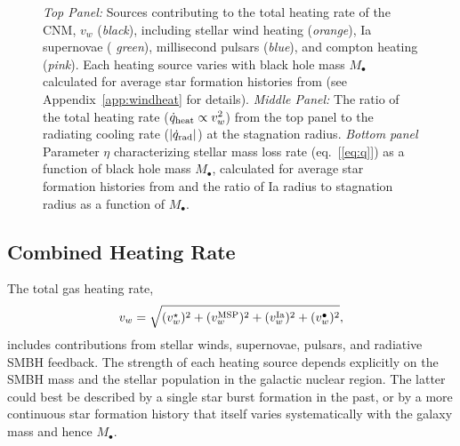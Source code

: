 \documentclass[usenatbib,fleqn]{mn2e}
\newcommand{\Mbh}[1][]{M_{\bullet#1}}
\newcommand{\vwO}{v_{w}}
\begin{document}
\begin{figure}
\caption{\label{fig:vwSources} {\it Top Panel:} Sources contributing
  to the total heating rate of the CNM, $\vwO$ ({\it black}),
  including stellar wind heating ({\it orange}), Ia supernovae ({\it
    green}), millisecond pulsars ({\it blue}), and compton heating
  ({\it pink}).  Each heating source varies with black hole mass
  $\Mbh$ calculated for average star formation histories from
  \citet{MosterNaab+:2013a} (see Appendix~\ref{app:windheat} for
  details).  {\it Middle Panel:} The ratio of the total heating rate
  ($\dot{q}_{\rm heat} \propto v_{w}^{2}$) from the top panel to the
  radiating cooling rate ($|\dot{q}_{\rm rad}|$) at the stagnation
  radius. {\it Bottom panel} Parameter $\eta$ characterizing stellar
  mass loss rate (eq.~[\ref{eq:q}]) as a function of black hole mass
  $\Mbh$, calculated for average star formation histories from and the
  ratio of Ia radius to stagnation radius as a function of $\Mbh$.}
\end{figure}





\subsection{Combined Heating Rate} 
\label{sec:combined}


The total gas heating rate, 
\begin{equation}
\vwO = \sqrt{(v_{w}^{\star})^{2} + (v_{w}^{\rm MSP})^{2} + (v_{w}^{\rm Ia})^{2} + (v_{w}^{\bullet})^{2}},
\label{eq:vtot}
\end{equation}
includes contributions from stellar winds, supernovae, pulsars, and radiative SMBH feedback.  The strength of each heating source depends explicitly on the SMBH mass and the stellar population in the galactic nuclear region.  The latter could best be described by a single star burst formation in the past, or by a more continuous star formation history that itself varies systematically with the galaxy mass and hence $\Mbh$.
\end{document}
